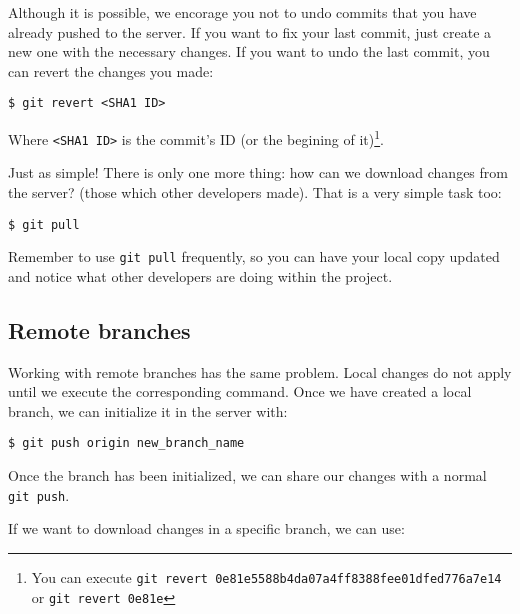 \documentclass[a4paper,10pt]{article}
\newenvironment{terminal}
  {
    \vspace{+10pt}
    \begin{center}
    \begin{minipage}{0.95\textwidth}
    \begin{framed}
  }
  {
    \end{framed}
    \end{minipage}
    \end{center}
    \vspace{+10pt}
  }
\begin{document}
Although it is possible, we encorage you not to undo commits that you
have already pushed to the server. If you want to fix your last
commit, just create a new one with the necessary changes. If you want
to undo the last commit, you can revert the changes you made:

\begin{terminal}
\begin{verbatim}
$ git revert <SHA1 ID>
\end{verbatim}
\end{terminal}

Where \texttt{<SHA1 ID>} is the commit's ID (or the begining of
it)\footnote{You can execute \texttt{git revert
0e81e5588b4da07a4ff8388fee01dfed776a7e14} or \texttt{git revert 0e81e}}.

Just as simple! There is only one more thing: how can we download
changes from the server? (those which other developers made). That is
a very simple task too:

\begin{terminal}
\begin{verbatim}
$ git pull
\end{verbatim}
\end{terminal}

\begin{tip}
Remember to use \texttt{git pull} frequently, so you can have your
local copy updated and notice what other developers are doing within
the project.
\end{tip}

\subsection{Remote branches}

Working with remote branches has the same problem. Local changes do not
apply until we execute the corresponding command. Once we have created
a local branch, we can initialize it in the server with:

\begin{terminal}
\begin{verbatim}
$ git push origin new_branch_name
\end{verbatim}
\end{terminal}

Once the branch has been initialized, we can share our changes with a
normal \texttt{git push}.

If we want to download changes in a specific branch, we can use:
\end{document}
